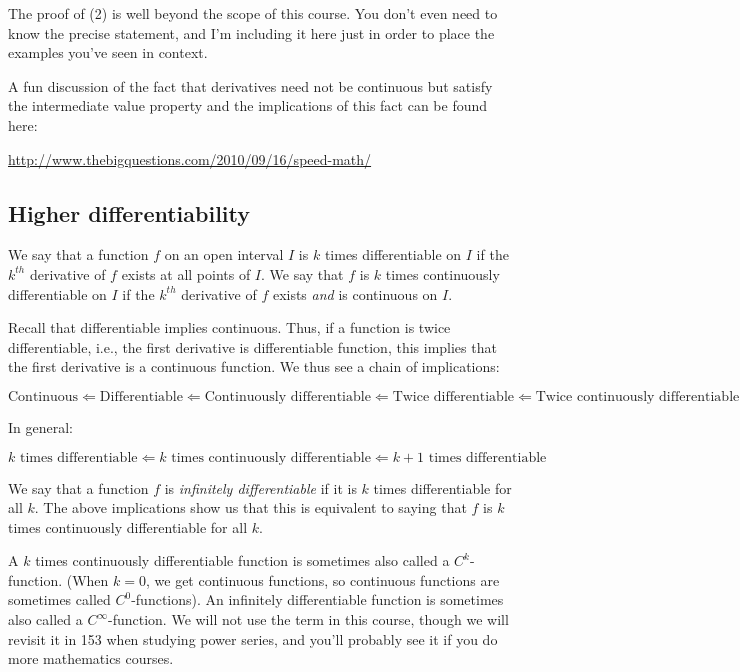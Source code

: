 \documentclass[10pt]{amsart}
\begin{document}
The proof of (2) is well beyond the scope of this course. You don't
even need to know the precise statement, and I'm including it here
just in order to place the examples you've seen in context.

A fun discussion of the fact that derivatives need not be continuous
but satisfy the intermediate value property and the implications of
this fact can be found here:

\url{http://www.thebigquestions.com/2010/09/16/speed-math/}

\subsection{Higher differentiability}

We say that a function $f$ on an open interval $I$ is $k$ times
differentiable on $I$ if the $k^{th}$ derivative of $f$ exists at all
points of $I$. We say that $f$ is $k$ times continuously
differentiable on $I$ if the $k^{th}$ derivative of $f$ exists {\em
and} is continuous on $I$.

Recall that differentiable implies continuous. Thus, if a function is
twice differentiable, i.e., the first derivative is differentiable
function, this implies that the first derivative is a continuous
function. We thus see a chain of implications:

$$\text{Continuous} \Leftarrow \text{Differentiable} \Leftarrow \text{Continuously differentiable} \Leftarrow \text{Twice differentiable} \Leftarrow \text{Twice continuously differentiable} \leftarrow \dots$$


In general:

$$k \text{ times differentiable} \Leftarrow k \text{ times continuously differentiable} \Leftarrow k + 1 \text{ times differentiable}$$

We say that a function $f$ is {\em infinitely differentiable} if it is
$k$ times differentiable for all $k$. The above implications show us
that this is equivalent to saying that $f$ is $k$ times continuously
differentiable for all $k$.

A $k$ times continuously differentiable function is sometimes also
called a $C^k$-function. (When $k = 0$, we get continuous functions,
so continuous functions are sometimes called $C^0$-functions). An
infinitely differentiable function is sometimes also called a
$C^\infty$-function. We will not use the term in this course, though
we will revisit it in 153 when studying power series, and you'll
probably see it if you do more mathematics courses.
\end{document}
